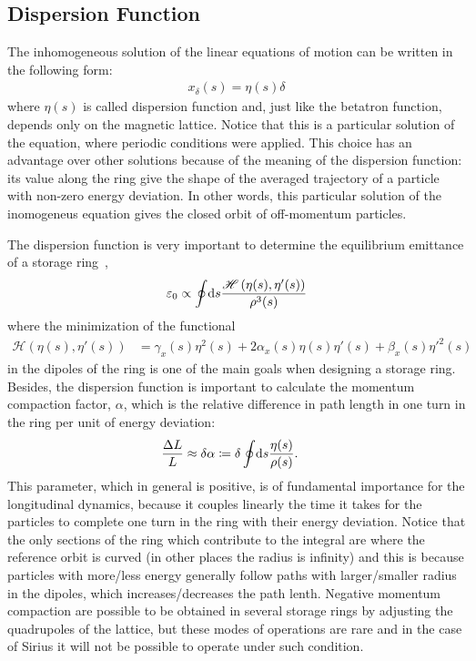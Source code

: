 \subsection{Dispersion Function}

	The inhomogeneous solution of the linear equations of motion can be written in the following form:
	\begin{align}\label{eq:dispersion_function}
		x_\delta(s) = \eta(s)\delta
	\end{align}
	where $\eta(s)$ is called dispersion function and, just like the betatron function, depends only on the magnetic lattice. Notice that this is a particular solution of the equation, where periodic conditions were applied. This choice has an advantage over other solutions because of the meaning of the dispersion function: its value along the ring give the shape of the averaged trajectory of a particle with non-zero energy deviation. In other words, this particular solution of the inomogeneus equation gives the closed orbit of off-momentum particles.

	The dispersion function is very important to determine the equilibrium emittance of a storage ring~\cite[pp. 304]{Wiedemann2007},
    \begin{align}
        \varepsilon_0 \propto \oint\!\text{d}s \frac{\mathscr{H}\left(\eta(s),\eta'(s)\right)}{\rho^3(s)}
    \end{align}
     where the minimization of the functional
	\begin{align}
		\mathscr{H}(\eta(s), \eta'(s)) &= \gamma_x(s)\eta^2(s) +
										2\alpha_x(s)\eta(s)\eta'(s) +
										 \beta_x(s)\eta'^2(s)
	\end{align}
	in the dipoles of the ring is one of the main goals when designing a storage ring. Besides, the dispersion function is important to calculate the momentum compaction factor, $\alpha$, which is the relative difference in path length in one turn in the ring per unit of energy deviation:
	\begin{align}\label{eq:momentum_compaction}
		\frac{\Delta L}{L} &\approx \delta \alpha \coloneqq \delta \oint\!\text{d}s \frac{\eta(s)}{\rho(s)}.
	\end{align}
	This parameter, which in general is positive, is of fundamental importance for the longitudinal dynamics, because it couples linearly the time it takes for the particles to complete one turn in the ring with their energy deviation. Notice that the only sections of the ring which contribute to the integral are where the reference orbit is curved (in other places the radius is infinity) and this is because particles with more/less energy generally follow paths with larger/smaller radius in the dipoles, which increases/decreases the path lenth. Negative momentum compaction are possible to be obtained in several storage rings by adjusting the quadrupoles of the lattice, but these modes of operations are rare and in the case of Sirius it will not be possible to operate under such condition.


